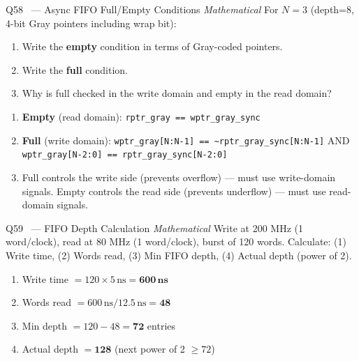\documentclass[12pt,a4paper]{article}
\newcommand{\advanced}{%
  \fbox{\textcolor{advred}{\bfseries\sffamily\small ADVANCED}}}
\begin{document}
\begin{questionbox}{Q58 \advanced\ --- Async FIFO Full/Empty Conditions \hfill\textit{Mathematical}}
For $N=3$ (depth=8, 4-bit Gray pointers including wrap bit):
\begin{enumerate}[label=\textbf{\alph*)}]
  \item Write the \textbf{empty} condition in terms of Gray-coded pointers.
  \item Write the \textbf{full} condition.
  \item Why is full checked in the write domain and empty in the read domain?
\end{enumerate}
\end{questionbox}

\begin{answerbox}
\begin{enumerate}[label=\textbf{\alph*)}]
  \item \textbf{Empty} (read domain): \texttt{rptr\_gray == wptr\_gray\_sync}
  \item \textbf{Full} (write domain): \texttt{wptr\_gray[N:N-1] == \textasciitilde rptr\_gray\_sync[N:N-1]} AND \texttt{wptr\_gray[N-2:0] == rptr\_gray\_sync[N-2:0]}
  \item Full controls the write side (prevents overflow) --- must use write-domain signals. Empty controls the read side (prevents underflow) --- must use read-domain signals.
\end{enumerate}
\end{answerbox}

\begin{questionbox}{Q59 \advanced\ --- FIFO Depth Calculation \hfill\textit{Mathematical}}
Write at 200 MHz (1 word/clock), read at 80 MHz (1 word/clock), burst of 120 words.
Calculate: (1) Write time, (2) Words read, (3) Min FIFO depth, (4) Actual depth (power of 2).
\end{questionbox}

\begin{answerbox}
\begin{enumerate}
  \item Write time $= 120 \times 5\,\text{ns} = \mathbf{600\,ns}$
  \item Words read $= 600\,\text{ns} / 12.5\,\text{ns} = \mathbf{48}$
  \item Min depth $= 120 - 48 = \mathbf{72}$ entries
  \item Actual depth $= \mathbf{128}$ (next power of 2 $\geq 72$)
\end{enumerate}
\end{answerbox}
\end{document}
